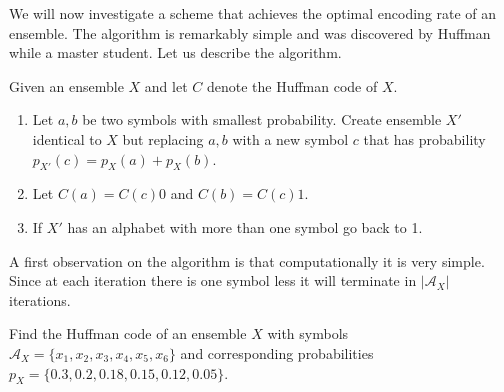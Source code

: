 We will now investigate a scheme that achieves the optimal encoding rate of an ensemble. The algorithm is remarkably simple and was discovered by Huffman \cite{huffman1952method} while a master student. Let us describe the algorithm.

Given an ensemble $X$ and let $C$ denote the Huffman code of $X$.
\begin{enumerate}
\item Let $a,b$ be two symbols with smallest probability. Create ensemble $X'$ identical to $X$ but replacing $a,b$ with a new symbol $c$ that has probability $p_{X'}(c)=p_X(a)+p_X(b)$. 
\item Let $C(a)=C(c)0$ and $C(b)=C(c)1$.
\item If $X'$ has an alphabet with more than one symbol go back to 1.
\end{enumerate}
A first observation on the algorithm is that computationally it is very simple. Since at each iteration there is one symbol less it will terminate in $|\mathcal A_X|$ iterations.
\begin{exercise}
Find the Huffman code of an ensemble $X$ with symbols $\mathcal A_X=\{x_1,x_2,x_3,x_4,x_5,x_6\}$ and corresponding probabilities $p_X=\{0.3,0.2,0.18,0.15,0.12,0.05\}$.
\end{exercise}


